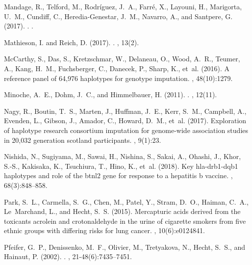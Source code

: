 \documentclass[9pt,article]{template}
\begin{document}
\begin{thebibliography}{}
Mandage, R., Telford, M., Rodr{\'{i}}guez, J.~A., Farr{\'{e}}, X., Layouni, H.,
  Marigorta, U.~M., Cundiff, C., Heredia-Genestar, J.~M., Navarro, A., and
  Santpere, G. (2017).
.
.

Mathieson, I. and Reich, D. (2017).
.
, 13(2).

McCarthy, S., Das, S., Kretzschmar, W., Delaneau, O., Wood, A.~R., Teumer, A.,
  Kang, H.~M., Fuchsberger, C., Danecek, P., Sharp, K., et~al. (2016).
\newblock A reference panel of 64,976 haplotypes for genotype imputation.
, 48(10):1279.

Minoche, A.~E., Dohm, J.~C., and Himmelbauer, H. (2011).
.
, 12(11).

Nagy, R., Boutin, T.~S., Marten, J., Huffman, J.~E., Kerr, S.~M., Campbell, A.,
  Evenden, L., Gibson, J., Amador, C., Howard, D.~M., et~al. (2017).
\newblock Exploration of haplotype research consortium imputation for
  genome-wide association studies in 20,032 generation scotland participants.
, 9(1):23.

Nishida, N., Sugiyama, M., Sawai, H., Nishina, S., Sakai, A., Ohashi, J., Khor,
  S.-S., Kakisaka, K., Tsuchiura, T., Hino, K., et~al. (2018).
\newblock Key hla-drb1-dqb1 haplotypes and role of the btnl2 gene for response
  to a hepatitis b vaccine.
, 68(3):848--858.

Park, S.~L., Carmella, S.~G., Chen, M., Patel, Y., Stram, D.~O., Haiman, C.~A.,
  Le~Marchand, L., and Hecht, S.~S. (2015).
\newblock Mercapturic acids derived from the toxicants acrolein and
  crotonaldehyde in the urine of cigarette smokers from five ethnic groups with
  differing risks for lung cancer.
, 10(6):e0124841.

Pfeifer, G.~P., Denissenko, M.~F., Olivier, M., Tretyakova, N., Hecht, S.~S.,
  and Hainaut, P. (2002).
.
, 21-48(6):7435--7451.


\end{thebibliography}
\end{document}
